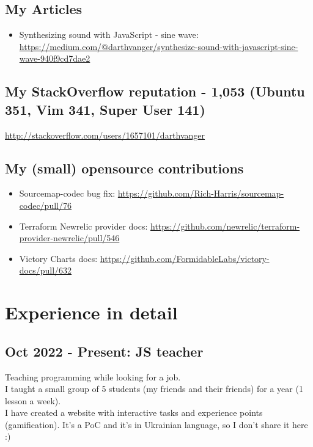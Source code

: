 \documentclass[a4paper, 14pt]{article}
\begin{document}
  \subsection{My Articles}
    \begin{itemize}
      \item Synthesizing sound with JavaScript - sine wave: \url{https://medium.com/@darthvanger/synthesize-sound-with-javascript-sine-wave-940f9cd7dae2}
    \end{itemize}

  \subsection{My StackOverflow reputation - 1,053 (Ubuntu 351, Vim 341, Super User 141)}
    \url{http://stackoverflow.com/users/1657101/darthvanger}

  \subsection{My (small) opensource contributions}
    \begin{itemize}
      \item Sourcemap-codec bug fix: \url{https://github.com/Rich-Harris/sourcemap-codec/pull/76} \\
      \item Terraform Newrelic provider docs: \url{https://github.com/newrelic/terraform-provider-newrelic/pull/546} \\
      \item Victory Charts docs: \url{https://github.com/FormidableLabs/victory-docs/pull/632}
    \end{itemize}

\section{Experience in detail}

  \subsection{Oct 2022 - Present: JS teacher}
    Teaching programming while looking for a job. \\
    I taught a small group of 5 students (my friends and their friends) for a year (1 lesson a week). \\
    I have created a website with interactive tasks and experience points (gamification). It's a PoC and it's in Ukrainian language, so I don't share it here :)
\end{document}
